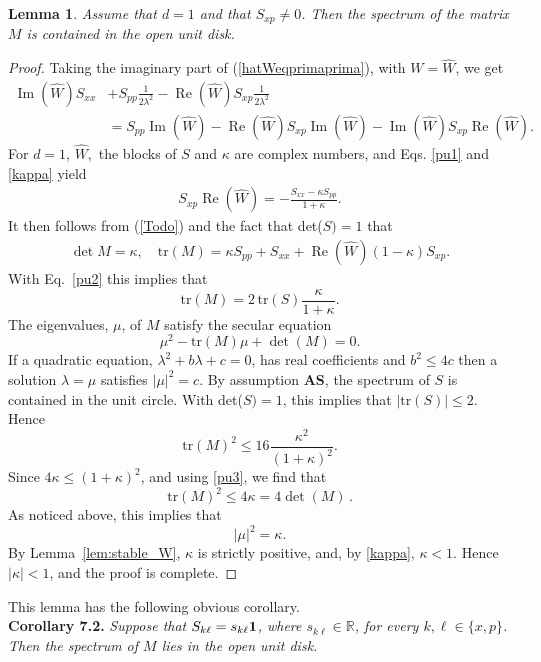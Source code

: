 \documentclass[11pt]{article}
\newtheorem{lemma}[theorem]{Lemma}
\renewcommand{\Re}{\operatorname{Re}}
\renewcommand{\Im}{\operatorname{Im}}
\newcommand{\tr }{\mathrm{tr}}
\begin{document}
\begin{lemma}\label{LLL1}
	Assume that $d =1$ and that $S_{xp} \neq 0$. Then the spectrum of the matrix $M$ is contained in the open unit disk.
\end{lemma}
\begin{proof}
	Taking the imaginary part of (\ref{hatWeqprimaprima}), with $W=\widehat{W}$, we get
	\begin{align}\label{pu1}
	\Im(\widehat W)S_{xx} &+  S_{pp} \frac{1}{2 \lambda^2} - \Re(\widehat W) S_{xp}
	\frac{1}{2 \lambda^2} \nonumber \\
	&= S_{pp} \Im(\widehat W) - \Re(\widehat W) S_{xp} \Im(\widehat W) -
	\Im(\widehat W) S_{xp} \Re(\widehat W).
	\end{align}
	For $d = 1$, $\widehat W,$ the blocks of $S$ and $\kappa$ are complex numbers, and Eqs. \eqref{pu1} and \eqref{kappa} 
	yield
	\begin{align}\label{pu2}
	S_{xp} \Re(\widehat{W}) = - \frac{S_{xx} - \kappa S_{pp}}{1 + \kappa}.
	\end{align}
	It then follows from  (\ref{Todo}) and the fact that det($S)=1$ that
	\begin{align}\label{pu3}
	\det{M} = \kappa, \quad \tr(M) = \kappa S_{pp} + S_{xx} + \Re(\widehat{W}) (1 - \kappa) S_{xp}.
	\end{align}
	With Eq.~\eqref{pu2} this implies that
	$$
	\tr(M) = 2\, \tr(S) \frac{\kappa}{1+ \kappa}.
	$$
	The eigenvalues, $\mu$, of $M$ satisfy the secular equation
	$$
	\mu^2 - \tr(M) \mu + \det(M) = 0.
	$$
 If a quadratic equation, $\lambda^2 + b \lambda + c = 0$, has real coefficients and $b^2 \leq  4 c$ then a solution 
	$\lambda=\mu$ satisfies $|\mu|^2=c$. By assumption {\bf{AS}}, the spectrum of $S$ is 
	contained in the unit circle. With det($S)=1$, this implies that
	$ |\tr(S)| \leq 2. $
	Hence 
	$$
	\tr(M)^2 \leq 16 \frac{\kappa^2}{(1+ \kappa)^2}.
	$$
	Since $4 \kappa \leq (1 + \kappa)^2$, and using \eqref{pu3}, we find that 
	$$\tr(M)^2 \leq 4 \kappa =  4 \det(M)\,.$$ 
	As noticed above, this implies that
	$$
\vert\mu\vert^2=\kappa.
	$$
	By Lemma~\ref{lem:stable_W}, $\kappa $ is strictly positive, and, by \eqref{kappa}, $\kappa  < 1$. Hence $\vert \kappa \vert <1$, and the proof is complete.
\end{proof}
This lemma has the following obvious corollary.\\

\noindent
{\bf{Corollary 7.2.}}\label{LLL2} \textit{Suppose that  $S_{k\ell} =  s_{k\ell} {\bf{1}} $, where $s_{k\ell} \in \mathbb{R} $, for every $k,\ell \in \{ x, p\} $. Then the spectrum of  $M $ lies in the open unit disk. } \\
\end{document}
